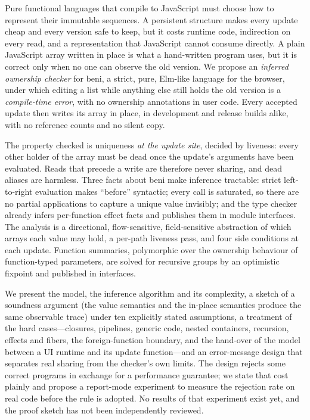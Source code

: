 Pure functional languages that compile to JavaScript must choose how to represent their immutable
sequences. A persistent structure makes every update cheap and every version safe to keep, but it
costs runtime code, indirection on every read, and a representation that JavaScript cannot consume
directly. A plain JavaScript array written in place is what a hand-written program uses, but it is
correct only when no one can observe the old version. We propose an \emph{inferred ownership
checker} for beni, a strict, pure, Elm-like language for the browser, under which editing a list
while anything else still holds the old version is a \emph{compile-time error}, with no ownership
annotations in user code. Every accepted update then writes its array in place, in development and
release builds alike, with no reference counts and no silent copy.

The property checked is uniqueness \emph{at the update site}, decided by liveness: every other
holder of the array must be dead once the update's arguments have been evaluated. Reads that
precede a write are therefore never sharing, and dead aliases are harmless. Three facts about beni
make inference tractable: strict left-to-right evaluation makes ``before'' syntactic; every call
is saturated, so there are no partial applications to capture a unique value invisibly; and the
type checker already infers per-function effect facts and publishes them in module interfaces. The
analysis is a directional, flow-sensitive, field-sensitive abstraction of which arrays each value
may hold, a per-path liveness pass, and four side conditions at each update. Function summaries,
polymorphic over the ownership behaviour of function-typed parameters, are solved for recursive
groups by an optimistic fixpoint and published in interfaces.

We present the model, the inference algorithm and its complexity, a sketch of a soundness argument
(the value semantics and the in-place semantics produce the same observable trace) under ten
explicitly stated assumptions, a treatment of the hard cases---closures, pipelines, generic code,
nested containers, recursion, effects and fibers, the foreign-function boundary, and the hand-over
of the model between a UI runtime and its update function---and an error-message design that
separates real sharing from the checker's own limits. The design rejects some correct programs in
exchange for a performance guarantee; we state that cost plainly and propose a report-mode
experiment to measure the rejection rate on real code before the rule is adopted. No results of
that experiment exist yet, and the proof sketch has not been independently reviewed.
